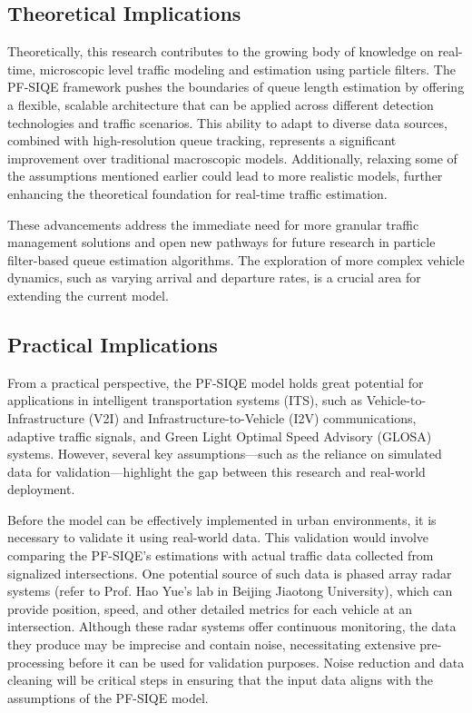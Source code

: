 \subsection{Theoretical Implications}
Theoretically, this research contributes to the growing body of knowledge on real-time, microscopic level traffic modeling and estimation using particle filters. The PF-SIQE framework pushes the boundaries of queue length estimation by offering a flexible, scalable architecture that can be applied across different detection technologies and traffic scenarios. This ability to adapt to diverse data sources, combined with high-resolution queue tracking, represents a significant improvement over traditional macroscopic models. Additionally, relaxing some of the assumptions mentioned earlier could lead to more realistic models, further enhancing the theoretical foundation for real-time traffic estimation.

These advancements address the immediate need for more granular traffic management solutions and open new pathways for future research in particle filter-based queue estimation algorithms. The exploration of more complex vehicle dynamics, such as varying arrival and departure rates, is a crucial area for extending the current model.

\subsection{Practical Implications}
From a practical perspective, the PF-SIQE model holds great potential for applications in intelligent transportation systems (ITS), such as Vehicle-to-Infrastructure (V2I) and Infrastructure-to-Vehicle (I2V) communications, adaptive traffic signals, and Green Light Optimal Speed Advisory (GLOSA) systems. However, several key assumptions—such as the reliance on simulated data for validation—highlight the gap between this research and real-world deployment.

Before the model can be effectively implemented in urban environments, it is necessary to validate it using real-world data. This validation would involve comparing the PF-SIQE’s estimations with actual traffic data collected from signalized intersections. One potential source of such data is phased array radar systems (refer to Prof. Hao Yue's lab in Beijing Jiaotong University), which can provide position, speed, and other detailed metrics for each vehicle at an intersection. Although these radar systems offer continuous monitoring, the data they produce may be imprecise and contain noise, necessitating extensive pre-processing before it can be used for validation purposes. Noise reduction and data cleaning will be critical steps in ensuring that the input data aligns with the assumptions of the PF-SIQE model.

